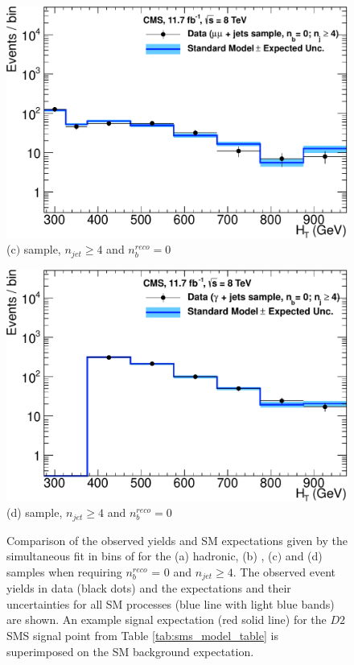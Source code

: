 \begin{figure}[ht]
\begin{minipage}[b]{0.48 \linewidth}
\includegraphics[width = 1.0\linewidth]{plots/mumu_0b_ge4j_logy.pdf}
\centering (c$)$ \dimupjets sample, $n_{jet} \geq 4$ and $n_{b}^{reco} = 0$ 
\end{minipage}
\quad
\begin{minipage}[b]{0.48\linewidth}
\includegraphics[width = 1.0\linewidth]{plots/photon_0b_ge4j_logy.pdf}
\centering (d)  \gpjets sample, $n_{jet} \geq 4$ and $n_{b}^{reco} = 0$ 
\end{minipage}
\caption[Comparison of the observed yields and \ac{SM} expectations given by the simultaneous fit in bins of \theht for the (a) hadronic, (b) \mupjets, (c$)$ \dimupjets and (d) \gpjets samples when requiring $n_{b}^{reco}$ = 0 and $n_{jet} \geq 4$.]{Comparison of the observed yields and \ac{SM} expectations given by the simultaneous fit in bins of \theht for the (a) hadronic, (b) \mupjets, (c$)$ \dimupjets and (d) \gpjets samples when requiring $n_{b}^{reco}$ = 0 and $n_{jet} \geq 4$. The observed event yields in data (black dots) and the expectations and their uncertainties for all SM processes (blue line with light blue bands) are shown. An example signal expectation (red solid line) for the $D2$ \ac{SMS} signal point from Table \ref{tab:sms_model_table} is superimposed on the \ac{SM} background expectation.}
\label{fig:result0bhigh}
\end{figure}


